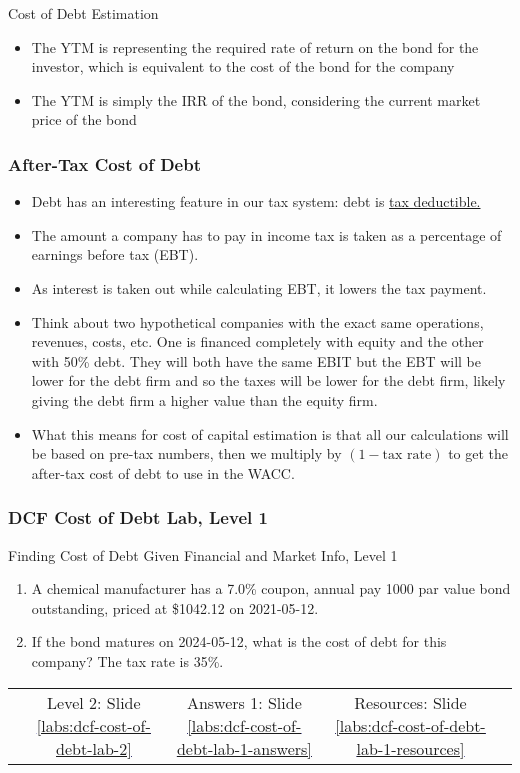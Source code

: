 \documentclass[handout, 11pt]{beamer}
\begin{document}
\begin{section}[Debt]{Cost of Debt Estimation}
\begin{frame}
\begin{itemize}
\vfill
\item The YTM is representing the required rate of return on the bond for the investor, which is equivalent to the cost of the bond for the company
\vfill
\item The YTM is simply the IRR of the bond, considering the current market price of the bond
\end{itemize}
\end{frame}
\begin{frame}
\frametitle{After-Tax Cost of Debt}
\begin{itemize}
\small
\vfill
\item Debt has an interesting feature in our tax system: debt is
\underline{tax deductible.}
\vfill
\item The amount a company has to pay in income tax is taken as a percentage of earnings before tax (EBT).
\vfill
\item As interest is taken out while calculating EBT, it lowers the tax payment.
\vfill
\item Think about two hypothetical companies with the exact same operations, revenues, costs, etc. One is financed completely with equity and the other with 50\% debt. They will both have the same EBIT but the EBT will be lower for the debt firm and so the taxes will be lower for the debt firm, likely giving the debt firm a higher value than the equity firm.
\vfill
\item What this means for cost of capital estimation is that all our calculations will be based on pre-tax numbers, then we multiply by $(1 - \text{tax rate})$ to get the after-tax cost of debt to use in the WACC.
\end{itemize}
\end{frame}
\begin{frame}
\frametitle{DCF Cost of Debt Lab, Level 1}
{
\begin{block}{Finding Cost of Debt Given Financial and Market Info, Level 1}
\begin{enumerate}
\item A chemical manufacturer has a 7.0\% coupon, annual pay 1000 par value bond outstanding, priced at \$1042.12 on 2021-05-12.
\item If the bond matures on 2024-05-12, what is the cost of debt for this company? The tax rate is 35\%.
\end{enumerate}
\vfill
\begin{tabular*}{\textwidth}{@{\extracolsep{\fill}}ccccc}
\toprule
\hfill & Level 2: Slide \textcolor{blue}{\underline{\ref{labs:dcf-cost-of-debt-lab-2}}} & Answers 1: Slide \textcolor{blue}{\underline{\ref{labs:dcf-cost-of-debt-lab-1-answers}}} & Resources: Slide \textcolor{blue}{\underline{\ref{labs:dcf-cost-of-debt-lab-1-resources}}} & \hfill\\


\end{tabular*}
\end{block}}
\end{frame}
\end{section}
\end{document}
